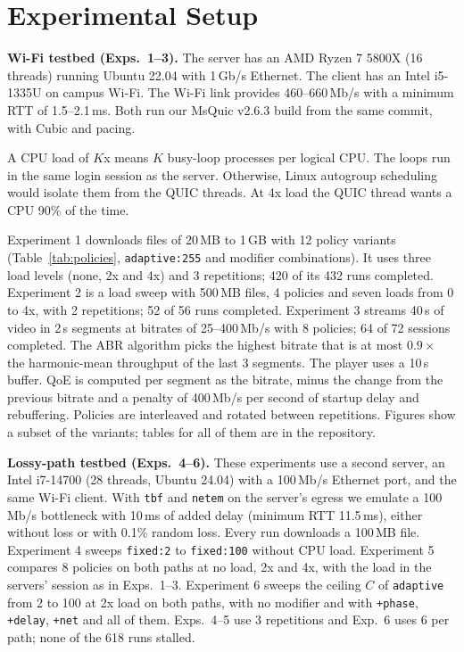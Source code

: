 \documentclass[11pt]{article}
\newcommand{\pol}[1]{\texttt{#1}}            %
\newcommand{\para}[1]{\textbf{#1}} %
\newcommand{\ms}{\,ms}
\newcommand{\mbps}{\,Mb/s}
\begin{document}
\FloatBarrier
\section{Experimental Setup}\label{sec:setup}
\para{Wi-Fi testbed (Exps.~1--3).} The server has an AMD Ryzen 7 5800X (16 threads) running
Ubuntu 22.04 with 1\,Gb/s Ethernet. The client has an Intel i5-1335U on campus Wi-Fi. The Wi-Fi
link provides 460--660\mbps{} with a minimum RTT of 1.5--2.1\ms. Both run our MsQuic v2.6.3 build
from the same commit, with Cubic and pacing.

A CPU load of $K$x means $K$ busy-loop processes per logical CPU. The loops run in the same login
session as the server. Otherwise, Linux autogroup scheduling would isolate them from the QUIC
threads. At 4x load the QUIC thread wants a CPU 90\% of the time.

Experiment 1 downloads files of 20\,MB to 1\,GB with 12 policy variants (Table~\ref{tab:policies},
\pol{adaptive:255} and modifier combinations). It uses three load levels (none, 2x and 4x) and 3
repetitions; 420 of its 432 runs completed. Experiment 2 is a load sweep with 500\,MB files, 4
policies and seven loads from 0 to 4x, with 2 repetitions; 52 of 56 runs completed. Experiment 3
streams 40\,s of video in 2\,s segments at bitrates of 25--400\mbps{} with 8 policies; 64 of 72
sessions completed. The ABR algorithm
picks the highest bitrate that is at most $0.9\times$ the harmonic-mean throughput of the last 3
segments. The player uses a 10\,s buffer. QoE is computed per segment as the bitrate, minus the change
from the previous bitrate and a penalty of 400\mbps{} per second of startup delay and
rebuffering. Policies are interleaved and rotated between repetitions. Figures show a subset of the variants;
tables for all of them are in the repository.

\para{Lossy-path testbed (Exps.~4--6).} These experiments use a second server, an Intel i7-14700
(28 threads, Ubuntu 24.04) with a 100\,Mb/s Ethernet port, and the same Wi-Fi client. With
\pol{tbf} and \pol{netem} on the server's egress we emulate a 100\mbps{} bottleneck with 10\ms{} of
added delay (minimum RTT 11.5\ms), either without loss or with 0.1\% random loss. Every run
downloads a 100\,MB file. Experiment 4 sweeps \pol{fixed:2} to \pol{fixed:100} without CPU load.
Experiment 5 compares 8 policies on both paths at no load, 2x and 4x, with the load in the servers'
session as in Exps.~1--3. Experiment 6 sweeps the ceiling $C$ of \pol{adaptive} from 2 to 100 at
2x load on both paths, with no modifier and with \pol{+phase}, \pol{+delay}, \pol{+net} and all of
them. Exps.~4--5 use 3 repetitions and Exp.~6 uses 6 per path; none of the 618 runs stalled.
\end{document}

